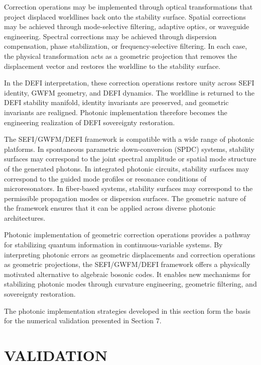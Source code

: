 \documentclass[aip,adv,reprint,floatfix]{revtex4-2}
\begin{document}
Correction operations may be implemented through
optical transformations that project displaced worldlines
back onto the stability surface.\cite{DuttonElectronField2026} Spatial corrections may
be achieved through mode-selective filtering, adaptive
optics, or waveguide engineering. Spectral corrections
may be achieved through dispersion compensation, phase
stabilization, or frequency-selective filtering. In each
case, the physical transformation acts as a geometric projection that removes the displacement vector and restores
the worldline to the stability surface.

In the DEFI interpretation, these correction operations
restore unity across SEFI identity, GWFM geometry, and
DEFI dynamics.\cite{DuttonSEFI2026} The worldline is returned to the DEFI
stability manifold, identity invariants are preserved, and
geometric invariants are realigned. Photonic implementation therefore becomes the engineering realization of
DEFI sovereignty restoration.

The SEFI/GWFM/DEFI framework is compatible
with a wide range of photonic platforms.\cite{DuttonElectronField2026}
In spontaneous
parametric down-conversion (SPDC) systems, stability
surfaces may correspond to the joint spectral amplitude
or spatial mode structure of the generated photons. In
integrated photonic circuits, stability surfaces may correspond to the guided mode profiles or resonance conditions of microresonators. In fiber-based systems, stability
surfaces may correspond to the permissible propagation
modes or dispersion surfaces. The geometric nature of
the framework ensures that it can be applied across diverse photonic architectures.

Photonic implementation of geometric correction operations provides a pathway for stabilizing quantum
information in continuous-variable systems.\cite{DuttonSEFI2026}
By interpreting photonic errors as geometric displacements
and correction operations as geometric projections, the
SEFI/GWFM/DEFI framework offers a physically motivated alternative to algebraic bosonic codes. It enables new mechanisms for stabilizing photonic modes
through curvature engineering, geometric filtering, and
sovereignty restoration.

The photonic implementation strategies developed in
this section form the basis for the numerical validation
presented in Section 7.
\section{VALIDATION}
\end{document}
